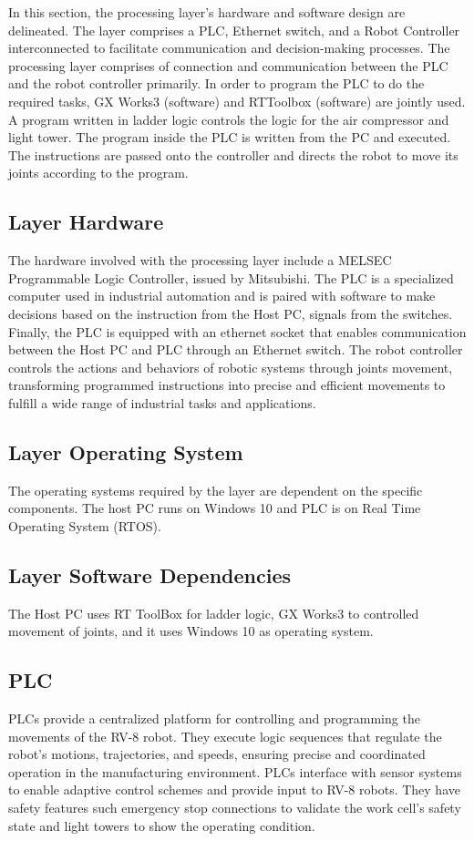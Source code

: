 In this section, the processing layer's hardware and software design are delineated. The layer comprises a PLC, Ethernet switch, and a Robot Controller interconnected to facilitate communication and decision-making processes. The processing layer comprises of connection and communication between the PLC and the robot controller primarily. In order to program the PLC to do the required tasks, GX Works3 (software) and RTToolbox (software) are jointly used. A program written in ladder logic controls the logic for the air compressor and light tower. The program inside the PLC is written from the PC and executed. The instructions are passed onto the controller and directs the robot to move its joints according to the program. 


\subsection{Layer Hardware}
The hardware involved with the processing layer include a MELSEC Programmable Logic Controller, issued by Mitsubishi. The PLC is a specialized computer used in industrial automation and is paired with software to make decisions based on the instruction from the Host PC, signals from the switches. Finally, the PLC is equipped with an ethernet socket that enables communication between the Host PC and PLC through an Ethernet switch. The robot controller controls the actions and behaviors of robotic systems through joints movement, transforming programmed instructions into precise and efficient movements to fulfill a wide range of industrial tasks and applications. 

\subsection{Layer Operating System}
The operating systems required by the layer are dependent on the specific components. The host PC runs on Windows 10 and PLC is on Real Time Operating System (RTOS).

\subsection{Layer Software Dependencies}
The Host PC uses RT ToolBox for ladder logic, GX Works3 to controlled movement of joints, and it uses Windows 10 as operating system. 

\subsection{PLC}
PLCs provide a centralized platform for controlling and programming the movements of the RV-8 robot. They execute logic sequences that regulate the robot's motions, trajectories, and speeds, ensuring precise and coordinated operation in the manufacturing environment. PLCs interface with sensor systems to enable adaptive control schemes and provide input to RV-8 robots. They have safety features such emergency stop connections to validate the work cell's safety state and light towers to show the operating condition. 

